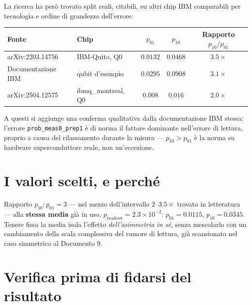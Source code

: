 \documentclass[11pt,a4paper]{article}
\begin{document}
La ricerca ha però trovato split reali, citabili, su altri chip IBM
comparabili per tecnologia e ordine di grandezza dell'errore:

\begin{center}
\renewcommand{\arraystretch}{1.3}
\small
\begin{tabular}{@{}llccc@{}}
\toprule
Fonte & Chip & $p_{01}$ & $p_{10}$ & Rapporto $p_{10}/p_{01}$\\
\midrule
arXiv:2203.14756 & IBM-Quito, Q0 & $0.0132$ & $0.0468$ & $3.5\times$\\
Documentazione IBM & qubit d'esempio & $0.0295$ & $0.0908$ & $3.1\times$\\
arXiv:2504.12575 & ibmq\_montreal, Q0 & $0.008$ & $0.016$ & $2.0\times$\\
\bottomrule
\end{tabular}
\end{center}

A questi si aggiunge una conferma qualitativa dalla documentazione IBM stessa:
l'errore \texttt{prob\_meas0\_prep1} è di norma il fattore dominante
nell'errore di lettura, proprio a causa del rilassamento durante la misura ---
$p_{10}>p_{01}$ è la norma su hardware superconduttore reale, non
un'eccezione.


\section{I valori scelti, e perché}

Rapporto $p_{10}:p_{01}=3$ --- nel mezzo dell'intervallo $2$--$3.5\times$
trovato in letteratura --- alla \textbf{stessa media} già in uso,
$p_\text{readout}=2.3\times10^{-2}$: $p_{01}=0.0115$, $p_{10}=0.0345$. Tenere
fissa la media isola l'effetto \emph{dell'asimmetria in sé}, senza mescolarlo
con un cambiamento della scala complessiva del rumore di lettura, già
scansionato nel caso simmetrico al Documento 9.

\section{Verifica prima di fidarsi del risultato}
\end{document}
